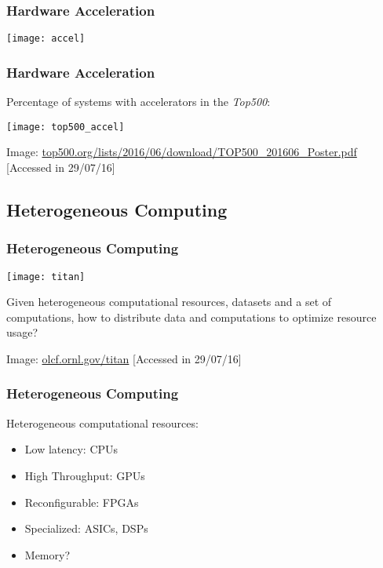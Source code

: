 \documentclass[10pt, compress]{beamer}
\begin{document}
\begin{frame}
    \frametitle{Hardware Acceleration}
    \centering
    \texttt{[image: accel]}
\end{frame}

\begin{frame}
    \frametitle{Hardware Acceleration}
    Percentage of systems with accelerators in the \textit{Top500}:

    \begin{center}
    \texttt{[image: top500\_accel]}
    \hfill

        \tiny{Image: \url{top500.org/lists/2016/06/download/TOP500_201606_Poster.pdf} [Accessed in 29/07/16]}
    \end{center}
\end{frame}

\subsection{Heterogeneous Computing}

\begin{frame}
    \frametitle{Heterogeneous Computing}
    \begin{center}
        \texttt{[image: titan]}
    \end{center}

    \pause

    Given \alert{heterogeneous} computational resources, \alert{datasets}
    and a set of \alert{computations}, how to distribute data and computations
    to \alert{optimize resource usage}?
    \hfill

    \begin{center}
    \tiny{Image: \url{olcf.ornl.gov/titan} [Accessed in 29/07/16]}
    \end{center}
\end{frame}

\begin{frame}
    \frametitle{Heterogeneous Computing}
    \alert{Heterogeneous} computational resources:
    \pause
    \begin{itemize}
        \item Low latency: CPUs
            \pause
        \item High Throughput: GPUs
            \pause
        \item Reconfigurable: FPGAs
            \pause
        \item Specialized: ASICs, DSPs
            \pause
        \item Memory?
    \end{itemize}
\end{frame}
\end{document}
